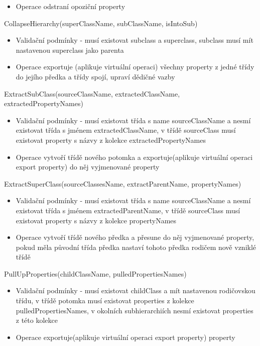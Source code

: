 \documentclass[11pt,twoside,a4paper]{book}
\begin{document}
\begin{list}{Operace :}{}
\begin{itemize}
    \item Operace odstraní opoziční property
  \end{itemize}
  \item CollapseHierarchy(superClassName, subClassName, isIntoSub)
  \begin{itemize}
    \item Validační podmínky - musí existovat subclass a superclass, subclass
    musí mít nastavenou superclass jako parenta
    \item Operace exportuje (aplikuje virtuální operaci) všechny property z
    jedné třídy do jejího předka a třídy spojí, upraví dědičné vazby
  \end{itemize}
  \item ExtractSubClass(sourceClassName, extractedClassName, extractedPropertyNames)
  \begin{itemize}
    \item Validační podmínky - musí existovat třída s name sourceClassName a
    nesmí existovat třída s jménem extractedClassName, v třídě sourceClass musí
    existovat property s názvy z kolekce extractedPropertyNames
    \item Operace vytvoří třídě nového potomka a
    exportuje(aplikuje virtuální operaci export property) do něj vyjmenované property
  \end{itemize}
  \item ExtractSuperClass(sourceClassesName, extractParentName, propertyNames)
  \begin{itemize}
    \item Validační podmínky - musí existovat třída s name sourceClassName a
    nesmí existovat třída s jménem extractedParentName, v třídě sourceClass musí
    existovat property s názvy z kolekce propertyNames
    \item Operace vytvoří třídě nového předka a přesune do něj vyjmenované
    property, pokud měla původní třída předka nastaví tohoto předka rodičem 
    nově vzniklé třídě
  \end{itemize}
  \item PullUpProperties(childClassName, pulledPropertiesNames)
  \begin{itemize}
    \item Validační podmínky - musí existovat childClass a mít nastavenou
    rodičovskou třídu, v třídě potomka musí existovat properties z kolekce
    pulledPropertiesNames, v okolních subhierarchiích nesmí existovat properties
    z této kolekce
    \item Operace exportuje(aplikuje virtuální operaci export property) property

\end{itemize}
\end{list}
\end{document}
